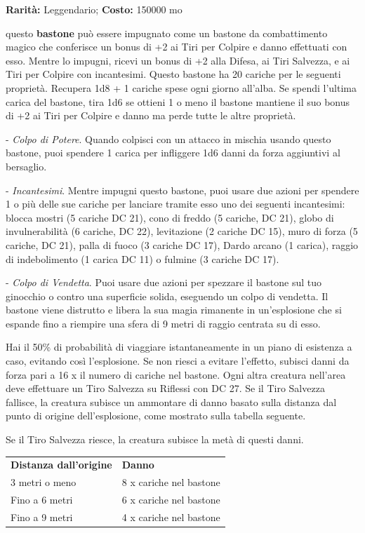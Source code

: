 \begin{multicols}{2}
\textbf{Rarità:} Leggendario; \textbf{Costo:} 150000 mo

questo \textbf{bastone} può essere impugnato come un bastone da combattimento magico che conferisce un bonus di +2 ai Tiri per Colpire e danno effettuati con esso. Mentre lo impugni, ricevi un bonus di +2 alla Difesa, ai Tiri Salvezza, e ai Tiri per Colpire con incantesimi. Questo bastone ha 20 cariche per le seguenti proprietà. Recupera 1d8 + 1 cariche spese ogni giorno all'alba. Se spendi l'ultima carica del bastone, tira 1d6 se ottieni 1 o meno il bastone mantiene il suo bonus di +2 ai Tiri per Colpire e danno ma perde tutte le altre proprietà.

- \emph{Colpo di Potere}. Quando colpisci con un attacco in mischia usando questo bastone, puoi spendere 1 carica per infliggere 1d6 danni da forza aggiuntivi al bersaglio.

- \emph{Incantesimi}. Mentre impugni questo bastone, puoi usare due azioni per spendere 1 o più delle sue cariche per lanciare tramite esso uno dei seguenti incantesimi: blocca mostri (5 cariche DC 21), cono di freddo (5 cariche, DC 21), globo di invulnerabilità (6 cariche, DC 22), levitazione (2 cariche DC 15), muro di forza (5 cariche, DC 21), palla di fuoco (3 cariche DC 17), Dardo arcano (1 carica), raggio di indebolimento (1 carica DC 11) o fulmine (3 cariche DC 17).

- \emph{Colpo di Vendetta}. Puoi usare due azioni per spezzare il bastone sul tuo ginocchio o contro una superficie solida, eseguendo un colpo di vendetta. Il bastone viene distrutto e libera la sua magia rimanente in un'esplosione che si espande fino a riempire una sfera di 9 metri di raggio centrata su di esso.

Hai il 50\% di probabilità di viaggiare istantaneamente in un piano di esistenza a caso, evitando così l'esplosione. Se non riesci a evitare l'effetto, subisci danni da forza pari a 16 x il numero di cariche nel bastone. Ogni altra creatura nell'area deve effettuare un Tiro Salvezza su Riflessi con DC 27. Se il Tiro Salvezza fallisce, la creatura subisce un ammontare di danno basato sulla distanza dal punto di origine dell'esplosione, come mostrato sulla tabella seguente.

Se il Tiro Salvezza riesce, la creatura subisce la metà di questi danni.

\medskip

\noindent\begin{tabularx}{0.49\textwidth}{Xl}
\hline
\textbf{Distanza dall'origine} &\textbf{Danno}\\
3 metri o meno &8 x cariche nel bastone\\
Fino a 6 metri& 6 x cariche nel bastone\\
Fino a 9 metri& 4 x cariche nel bastone
\end{tabularx}


\end{multicols}
